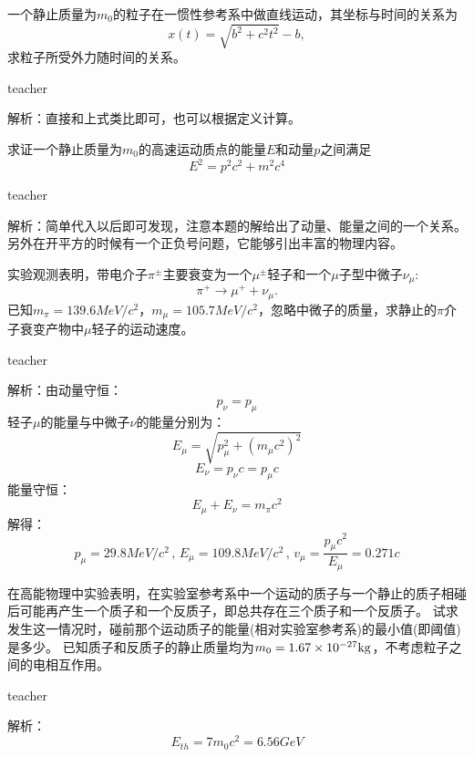 \begin{example}
一个静止质量为$m_0$的粒子在一惯性参考系中做直线运动，其坐标与时间的关系为
\[
x(t) = \sqrt{b^2+c^2t^2}-b,
\]
求粒子所受外力随时间的关系。
\begin{taggedblock}{teacher}
\noindent

解析：直接和上式类比即可，也可以根据定义计算。
\end{taggedblock}
\end{example}


\begin{example}
求证一个静止质量为$m_0$的高速运动质点的能量$E$和动量$p$之间满足
\[
E^2 = p^2c^2+m^2c^4
\]
\begin{taggedblock}{teacher}
\noindent

解析：简单代入以后即可发现，注意本题的解给出了动量、能量之间的一个关系。
另外在开平方的时候有一个正负号问题，它能够引出丰富的物理内容。
\end{taggedblock}
\end{example}


\begin{example}
实验观测表明，带电介子$\pi^\pm$主要衰变为一个$\mu^\pm$轻子和一个$\mu$子型中微子$\nu_\mu$:
\[
\pi^+\rightarrow\mu^++\nu_\mu.
\]
已知$m_\pi = 139.6\unit{MeV/c^2}$，$m_\mu = 105.7\unit{MeV/c^2}$，忽略中微子的质量，求静止的$\pi$介子衰变产物中$\mu$轻子的运动速度。
\begin{taggedblock}{teacher}
\noindent

解析：由动量守恒：
\[p_\nu = p_\mu\]
轻子$\mu$的能量与中微子$\nu$的能量分别为：
\[E_\mu=\sqrt{p_\mu^2+(m_\mu c^2)^2}\]
\[E_\nu = p_\nu c=p_\mu c\]
能量守恒：
\[E_\mu + E_\nu = m_\pi c^2\]
解得：
\[p_\mu=29.8\unit{MeV/c^2}\, , \, E_\mu=109.8\unit{MeV/c^2}\, , \, v_\mu=\frac{p_\mu c^2}{E_\mu}=0.271c\]
\end{taggedblock}
\end{example}


\begin{example}

在高能物理中实验表明，在实验室参考系中一个运动的质子与一个静止的质子相碰后可能再产生一个质子和一个反质子，即总共存在三个质子和一个反质子。
试求发生这一情况时，碰前那个运动质子的能量(相对实验室参考系)的最小值(即阈值)是多少。
已知质子和反质子的静止质量均为$m_0 = 1.67\times 10^{-27}{\rm{kg}}$，不考虑粒子之间的电相互作用。
\begin{taggedblock}{teacher}
\noindent

解析：\[E_{th}=7m_0 c^2=6.56\unit{GeV}\]
\end{taggedblock}
\end{example}



